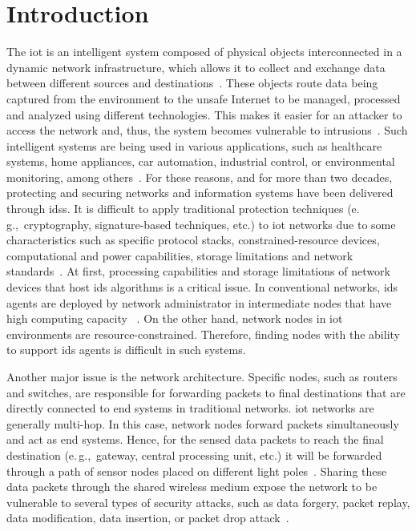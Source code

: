 \documentclass{llncs}
\newcommand{\eg}{e.\,g.,~}
\begin{document}
\section{Introduction}
\label{sec:intro}

The \gls*{iot} is an intelligent system composed of physical objects interconnected in a dynamic network infrastructure, which allows it to collect and exchange data between different sources and destinations~\cite{AMMAR2018,BOTTA2016}. These objects route data being captured from the environment to the unsafe Internet to be managed, processed and analyzed using different technologies. This makes it easier for an attacker to access the network and, thus, the system becomes vulnerable to intrusions~\cite{GUBBI2013}. Such intelligent systems are being used in various applications, such as healthcare systems, home appliances, car automation, industrial control, or environmental monitoring, among others~\cite{Lazarescu2017,Manikandan2018}. For these reasons, and for more than two decades, protecting and securing networks and information systems have been delivered through \gls*{idss}. It is difficult to apply traditional protection techniques (\eg cryptography, signature-based techniques, etc.) to \gls*{iot} networks due to some characteristics such as specific protocol stacks, constrained-resource devices, computational and power capabilities, storage limitations and network standards~\cite{SICARI2015}. At first, processing capabilities and storage limitations of network devices that host \gls*{ids} algorithms is a critical issue. In conventional networks, \gls*{ids} agents are deployed by network administrator in intermediate nodes that have high computing capacity ~\cite{zarpelao2017}. On the other hand, network nodes in \gls*{iot} environments are resource-constrained. Therefore, finding nodes with the ability to support \gls*{ids} agents is difficult in such systems. 

Another major issue is the network architecture. Specific nodes, such as routers and switches, are responsible for forwarding packets to final destinations that are directly connected to end systems in traditional networks. \gls*{iot} networks are generally multi-hop. In this case, network nodes forward packets simultaneously and act as end systems. Hence, for the sensed data packets to reach the final destination (\eg gateway, central processing unit, etc.) it will be forwarded through a path of sensor nodes placed on different light poles~\cite{zarpelao2017}. Sharing these data packets through the shared wireless medium expose the network to be vulnerable to several types of security attacks, such as data forgery, packet replay, data modification, data insertion, or packet drop attack~\cite{REN2008,KHAN2018}.
\end{document}
